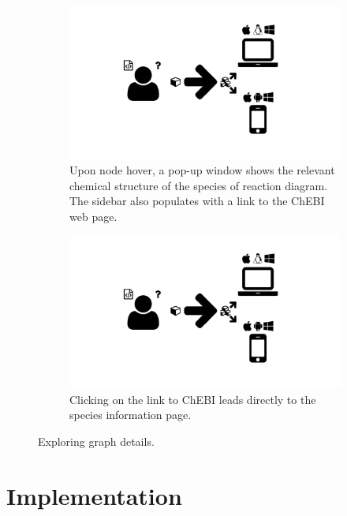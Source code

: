 \begin{figure}
  \centering
  \begin{subfigure}[b]{\textwidth}
    \includegraphics[width=\textwidth, page=8,trim=0.37cm 3.65cm 13.1cm 3.3cm, clip=true]{images/Figures.pdf}
    \caption{Upon node hover, a pop-up window shows the relevant chemical structure of the species of reaction diagram.
      The sidebar also populates with a link to the ChEBI web page.}
    \label{Figure:redox-detail-hover}
  \end{subfigure}
  \begin{subfigure}[b]{\textwidth}
    \includegraphics[width=\textwidth, page=8,trim=13.1cm 3.65cm 0.37cm 3.3cm, clip=true]{images/Figures.pdf}
    \caption{Clicking on the link to ChEBI leads directly to the species information page.}
    \label{Figure:redox-detail-chebi}
  \end{subfigure}
  \caption{Exploring graph details.}
  \label{Figure:redox-detail}
\end{figure}

\section{Implementation}
